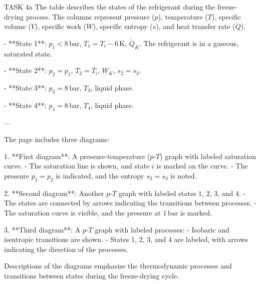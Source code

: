 TASK 4a  
The table describes the states of the refrigerant during the freeze-drying process. The columns represent pressure (\(p\)), temperature (\(T\)), specific volume (\(V\)), specific work (\(W\)), specific entropy (\(s\)), and heat transfer rate (\(\dot{Q}\)).  

- **State 1**:  
  \( p_1 < 8 \, \text{bar} \), \( T_1 = T_i - 6 \, \text{K} \), \( \dot{Q}_K \).  
  The refrigerant is in a gaseous, saturated state.  

- **State 2**:  
  \( p_2 = p_1 \), \( T_2 = T_i \), \( W_K \), \( s_2 = s_3 \).  

- **State 3**:  
  \( p_3 = 8 \, \text{bar} \), \( T_3 \), liquid phase.  

- **State 4**:  
  \( p_4 = 8 \, \text{bar} \), \( T_4 \), liquid phase.  

---

The page includes three diagrams:  

1. **First diagram**:  
   A pressure-temperature (\(p\)-\(T\)) graph with labeled saturation curve.  
   - The saturation line is shown, and state \(i\) is marked on the curve.  
   - The pressure \(p_1 = p_2\) is indicated, and the entropy \(s_2 = s_3\) is noted.  

2. **Second diagram**:  
   Another \(p\)-\(T\) graph with labeled states \(1\), \(2\), \(3\), and \(4\).  
   - The states are connected by arrows indicating the transitions between processes.  
   - The saturation curve is visible, and the pressure at \(1 \, \text{bar}\) is marked.  

3. **Third diagram**:  
   A \(p\)-\(T\) graph with labeled processes:  
   - Isobaric and isentropic transitions are shown.  
   - States \(1\), \(2\), \(3\), and \(4\) are labeled, with arrows indicating the direction of the processes.  

Descriptions of the diagrams emphasize the thermodynamic processes and transitions between states during the freeze-drying cycle.